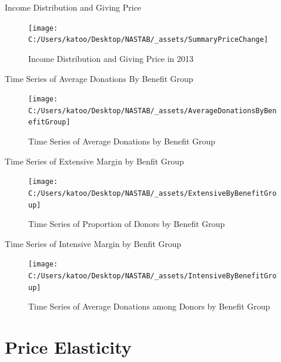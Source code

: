 \documentclass[
  ignorenonframetext,
]{beamer}
\begin{document}
\begin{frame}{Income Distribution and Giving Price}
\protect\hypertarget{income-distribution-and-giving-price}{}
\begin{figure}
\texttt{[image: C:/Users/katoo/Desktop/NASTAB/\_assets/SummaryPriceChange]} \caption{Income Distribution and Giving Price in 2013}\label{fig:unnamed-chunk-2}
\end{figure}
\end{frame}

\begin{frame}{Time Series of Average Donations By Benefit Group}
\protect\hypertarget{time-series-of-average-donations-by-benefit-group}{}
\begin{figure}
\texttt{[image: C:/Users/katoo/Desktop/NASTAB/\_assets/AverageDonationsByBenefitGroup]} \caption{Time Series of Average Donations by Benefit Group}\label{fig:unnamed-chunk-3}
\end{figure}
\end{frame}

\begin{frame}{Time Series of Extensive Margin by Benfit Group}
\protect\hypertarget{time-series-of-extensive-margin-by-benfit-group}{}
\begin{figure}
\texttt{[image: C:/Users/katoo/Desktop/NASTAB/\_assets/ExtensiveByBenefitGroup]} \caption{Time Series of Proportion of Donors by Benefit Group}\label{fig:unnamed-chunk-4}
\end{figure}
\end{frame}

\begin{frame}{Time Series of Intensive Margin by Benfit Group}
\protect\hypertarget{time-series-of-intensive-margin-by-benfit-group}{}
\begin{figure}
\texttt{[image: C:/Users/katoo/Desktop/NASTAB/\_assets/IntensiveByBenefitGroup]} \caption{Time Series of Average Donations among Donors by Benefit Group}\label{fig:unnamed-chunk-5}
\end{figure}
\end{frame}

\hypertarget{price-elasticity}{%
\section{Price Elasticity}\label{price-elasticity}}
\end{document}
